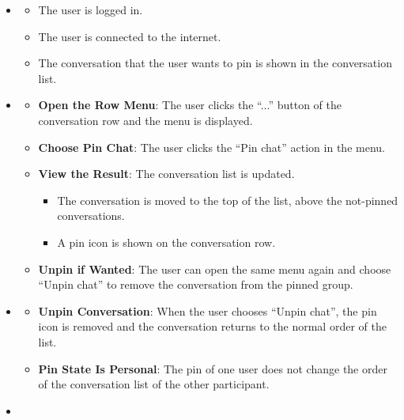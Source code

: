 \begin{itemize}[leftmargin=1.6em,topsep=4pt,itemsep=3pt,parsep=0pt,label=$\bullet$]
    \item {}

        \begin{itemize}[leftmargin=2.2em,topsep=2pt,itemsep=3pt,parsep=0pt,label=$\circ$]
            \item The user is logged in.
            \item The user is connected to the internet.
            \item The conversation that the user wants to pin is shown in the conversation list.
        \end{itemize}
    \item {}

        \begin{itemize}[leftmargin=2.2em,topsep=2pt,itemsep=3pt,parsep=0pt,label=$\circ$]
            \item \textbf{Open the Row Menu}: The user clicks the ``...'' button of the conversation row and the menu is displayed.
            \item \textbf{Choose Pin Chat}: The user clicks the ``Pin chat'' action in the menu.
            \item \textbf{View the Result}: The conversation list is updated.
                \begin{itemize}[leftmargin=2.2em,topsep=2pt,itemsep=3pt,parsep=0pt,label=$\blacksquare$]
                    \item The conversation is moved to the top of the list, above the not-pinned conversations.
                    \item A pin icon is shown on the conversation row.
                \end{itemize}
            \item \textbf{Unpin if Wanted}: The user can open the same menu again and choose ``Unpin chat'' to remove the conversation from the pinned group.
        \end{itemize}
    \item {}

        \begin{itemize}[leftmargin=2.2em,topsep=2pt,itemsep=3pt,parsep=0pt,label=$\circ$]
            \item \textbf{Unpin Conversation}: When the user chooses ``Unpin chat'', the pin icon is removed and the conversation returns to the normal order of the list.
            \item \textbf{Pin State Is Personal}: The pin of one user does not change the order of the conversation list of the other participant.
        \end{itemize}
    \item {}


\end{itemize}

